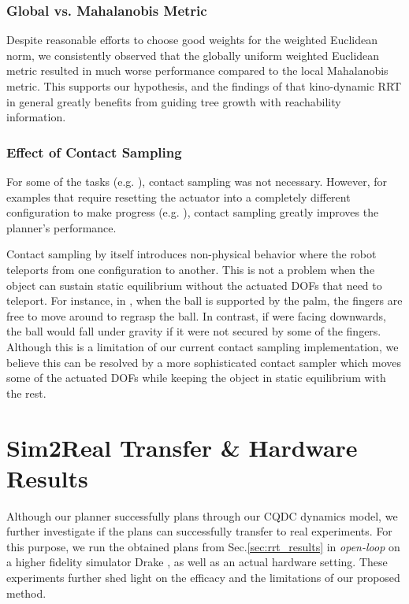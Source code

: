 \subsubsection{Global vs. Mahalanobis Metric} Despite reasonable efforts to choose good weights for the weighted Euclidean norm, we consistently observed that the globally uniform weighted Euclidean metric resulted in much worse performance compared to the local Mahalanobis metric. This supports our hypothesis, and the findings of \cite{shkolnik2009reachability} that kino-dynamic RRT in general greatly benefits from guiding tree growth with reachability information. 

\subsubsection{Effect of Contact Sampling} For some of the tasks (e.g. ), contact sampling was not necessary. However, for examples that require resetting the actuator into a completely different configuration to make progress (e.g. ), contact sampling greatly improves the planner's performance. 

Contact sampling by itself introduces non-physical behavior where the robot teleports from one configuration to another. This is not a problem when the object can sustain static equilibrium without the actuated DOFs that need to teleport. For instance, in , when the ball is supported by the palm, the fingers are free to move around to regrasp the ball. In contrast, if  were facing downwards, the ball would fall under gravity if it were not secured by some of the fingers. Although this is a limitation of our current contact sampling implementation, we believe this can be resolved by a more sophisticated contact sampler which moves some of the actuated DOFs while keeping the object in static equilibrium with the rest. 

\section{Sim2Real Transfer \& Hardware Results}\label{sec:sim2real}
Although our planner successfully plans through our CQDC dynamics model, we further investigate if the plans can successfully transfer to real experiments. For this purpose, we run the obtained plans from Sec.\ref{sec:rrt_results} in \emph{open-loop} on a higher fidelity simulator Drake \cite{drake}, as well as an actual hardware setting. These experiments further shed light on the efficacy and the limitations of our proposed method. 

